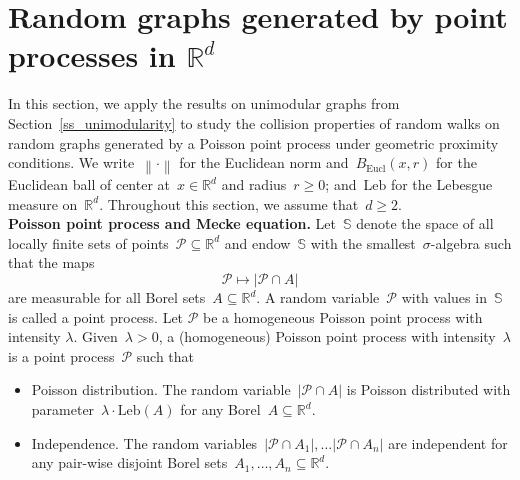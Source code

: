 \documentclass[a4paper,11pt]{article}
\newcommand{\EE}{\mathbb{E}}
\newcommand{\RR}{\mathbb{R}}
\newcommand\norm[1]{\left\lVert#1\right\rVert}
\theoremstyle{definition}
\begin{document}

\section{Random graphs generated by point processes in $\RR^d$}\label{ss_rgg_et_all}
In this section, we apply the results on unimodular graphs from Section~\ref{ss_unimodularity} to study the collision properties of random walks on random graphs generated by a Poisson point process under geometric proximity conditions. We write~$\norm{ \cdot }$ for the Euclidean norm and~$B_\mathrm{Eucl}(x,r)$ for the Euclidean ball of center at~$x \in \RR^d$ and radius~$r \ge 0$; and~$\mathrm{Leb}$ for the Lebesgue measure on~$\mathbb{R}^d$. Throughout this section, we assume that~$d \ge 2$. \\

\noindent \textbf{Poisson point process and Mecke equation.} Let~$\mathbb S$ denote the space of all locally finite sets of points~$\mathcal P \subseteq \RR^d$ and endow~$\mathbb S$ with the smallest~$\sigma$-algebra such that the maps
$$ \mathcal P \mapsto |\mathcal P \cap A|  $$
are measurable for all Borel sets~$A \subseteq \RR^d$. A random variable~$\mathcal P$ with values in~$\mathbb S$ is called a point process. Let $\mathcal P$ be a homogeneous Poisson point process with intensity $\lambda$. Given~$\lambda > 0$, a (homogeneous) Poisson point process with intensity~$\lambda$ is a point process~$\mathcal P$ such that
\begin{itemize}
    \item Poisson distribution. The random variable~$|\mathcal P \cap A|$ is Poisson distributed with parameter~$\lambda \cdot \mathrm{Leb}(A)$ for any Borel~$A \subseteq \RR^d$.
    \item Independence. The random variables~$|\mathcal P \cap A_1|,\dots |\mathcal P \cap A_n|$ are independent for any pair-wise disjoint Borel sets~$A_1,\dots,A_n \subseteq \RR^d$.
\end{itemize}
\end{document}
